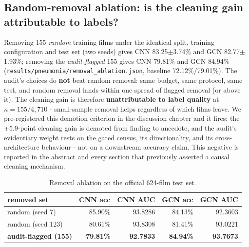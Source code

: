 \subsection{Random-removal ablation: is the cleaning gain attributable to labels?}
Removing 155 \emph{random} training films under the identical split,
training configuration and test set (two seeds) gives
CNN 83.25$\pm$3.74\%
and GCN 82.77$\pm$1.93\%;
removing the \emph{audit-flagged} 155 gives CNN 79.81\% and
GCN 84.94\% (\texttt{results/pneumonia/removal\_ablation.json},
baseline 72.12\%/79.01\%). The audit's choices do \textbf{not} beat random removal: same budget, same protocol, same test, and random removal lands within one spread of flagged removal (or above it). The cleaning gain is therefore \textbf{unattributable to label quality} at $n{=}155/4{,}710$ - small-sample removal helps regardless of which films leave. We pre-registered this demotion criterion in the discussion chapter and it fires: the +5.9-point cleaning gain is demoted from finding to anecdote, and the audit's evidentiary weight rests on the gated census, its directionality, and its cross-architecture behaviour - not on a downstream accuracy claim. This negative is reported in the abstract and every section that previously asserted a causal cleaning mechanism.
\begin{table}[h]
\centering\small
\caption{Removal ablation on the official 624-film test set.}
\label{tab:removal}
\begin{tabular}{l r r r r}
\hline
removed set & CNN acc & CNN AUC & GCN acc & GCN AUC \\ \hline
random (seed 7) & 85.90\% & 93.8286 & 84.13\% & 92.3603 \\
random (seed 123) & 80.61\% & 93.8308 & 81.41\% & 93.0221 \\
\hline
\textbf{audit-flagged (155)} & \textbf{79.81\%} & \textbf{92.7833} & \textbf{84.94\%} & \textbf{93.7673} \\
\hline
\end{tabular}
\end{table}

